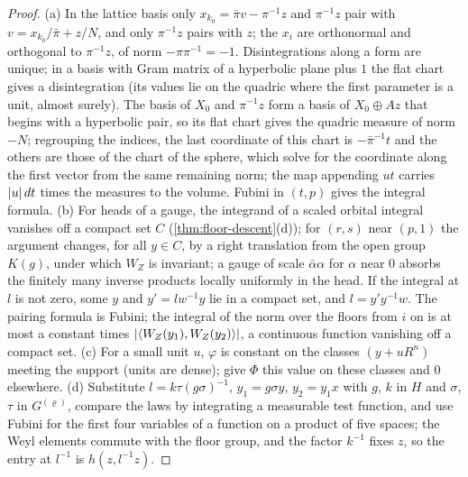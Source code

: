 \begin{proof}
(a) In the lattice basis only $x_{k_0}=\bar\pi v-\pi^{-1}z$ and $\pi^{-1}z$ pair with $v=x_{k_0}/\bar\pi+z/N$, and only $\pi^{-1}z$ pairs with $z$; the $x_i$ are orthonormal and orthogonal to $\pi^{-1}z$, of norm $-\pi\pi^{-1}=-1$. Disintegrations along a form are
unique; in a basis with Gram matrix of a hyperbolic plane plus $1$ the flat chart gives a disintegration (its values lie on the quadric where the first parameter is a unit, almost surely). The basis of $X_0$ and $\pi^{-1}z$ form a basis of
$X_0\oplus Az$ that begins with a hyperbolic pair, so its flat chart gives the quadric measure of norm $-N$; regrouping the indices, the last coordinate of this chart is $-\bar\pi^{-1}t$ and the others are those of the chart of the sphere, which
solve for the coordinate along the first vector from the same remaining norm; the map appending $ut$ carries $\lvert u\rvert\,dt$ times the measures to the volume. Fubini in $(t,p)$ gives the integral formula.
(b) For heads of a gauge, the integrand of a scaled orbital integral vanishes off a compact set $C$ (\cref{thm:floor-descent}(d)); for $(r,s)$ near $(p,1)$ the argument changes, for all $y\in C$, by a right translation from the open group $K(g)$,
under which $W_Z$ is invariant; a gauge of scale $\bar\alpha\alpha$ for $\alpha$ near $0$ absorbs the finitely many inverse products locally uniformly in the head. If the integral at $l$ is not zero, some $y$ and $y'=lw^{-1}y$ lie in a compact set, and
$l=y'y^{-1}w$. The pairing formula is Fubini; the integral of the norm over the floors from $i$ on is at most a constant times $\lvert \langle W_Z(y_1),W_Z(y_2)\rangle\rvert$, a continuous function vanishing off a compact set.
(c) For a small unit $u$, $\varphi$ is constant on the classes $(y+uR^n)$ meeting the support (units are dense); give $\Phi$ this value on these classes and $0$ elsewhere. (d) Substitute $l=k\tau(g\sigma)^{-1}$, $y_1=g\sigma y$, $y_2=y_1x$ with $g$, $k$ in $H$
and $\sigma$, $\tau$ in $G^{(\varrho)}$, compare the laws by integrating a measurable test function, and use Fubini for the first four variables of a function on a product of five spaces; the Weyl elements commute with the floor group, and the factor
$k^{-1}$ fixes $z$, so the entry at $l^{-1}$ is $h(z,l^{-1}z)$.
\end{proof}

